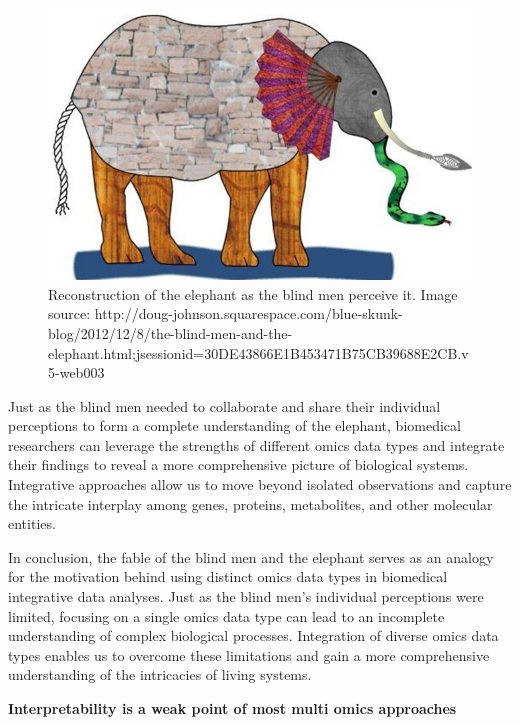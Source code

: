 \documentclass[a4paper, nobind]{templates/ociamthesis}
\begin{document}
\begin{figure}

{\centering \includegraphics[width=0.95\linewidth]{figures/chapter1/1-2_elephant} 

}

\caption[Reconstruction of the elephant as the blind men perceive it]{Reconstruction of the elephant as the blind men perceive it. Image source: http://doug-johnson.squarespace.com/blue-skunk-blog/2012/12/8/the-blind-men-and-the-elephant.html;jsessionid=30DE43866E1B453471B75CB39688E2CB.v5-web003}\label{fig:fig1-2}
\end{figure}

Just as the blind men needed to collaborate and share their individual perceptions to form a complete understanding of the elephant, biomedical researchers can leverage the strengths of different omics data types and integrate their findings to reveal a more comprehensive picture of biological systems. Integrative approaches allow us to move beyond isolated observations and capture the intricate interplay among genes, proteins, metabolites, and other molecular entities.

In conclusion, the fable of the blind men and the elephant serves as an analogy for the motivation behind using distinct omics data types in biomedical integrative data analyses. Just as the blind men's individual perceptions were limited, focusing on a single omics data type can lead to an incomplete understanding of complex biological processes. Integration of diverse omics data types enables us to overcome these limitations and gain a more comprehensive understanding of the intricacies of living systems.

\textbf{Interpretability is a weak point of most multi omics approaches}
\end{document}

